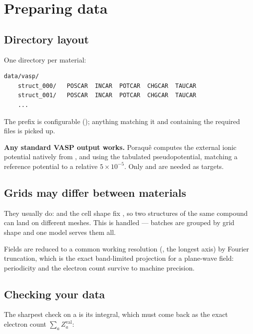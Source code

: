 \chapter{Preparing data}
\label{ch:data}

\section{Directory layout}

One directory per material:

\begin{lstlisting}
data/vasp/
    struct_000/   POSCAR  INCAR  POTCAR  CHGCAR  TAUCAR
    struct_001/   POSCAR  INCAR  POTCAR  CHGCAR  TAUCAR
    ...
\end{lstlisting}

The prefix is configurable (); anything matching it and
containing the required files is picked up.

\begin{ptip}
\textbf{Any standard VASP output works.} Poraqu\^e computes the external ionic
potential natively from ,  and  using the
tabulated pseudopotential, matching a reference potential to a relative
$5\times10^{-5}$. Only  and  are needed as targets.
\end{ptip}

\section{Grids may differ between materials}

They usually do:  and the cell shape fix , so
two structures of the same compound can land on different meshes. This is
handled --- batches are grouped by grid shape and one model serves them all.

Fields are reduced to a common working resolution (, the
longest axis) by Fourier truncation, which is the exact band-limited projection
for a plane-wave field: periodicity and the electron count survive to machine
precision.

\section{Checking your data}

The sharpest check on a  is its integral, which must come back as
the exact electron count $\sum_a Z^{\mathrm{val}}_a$:

